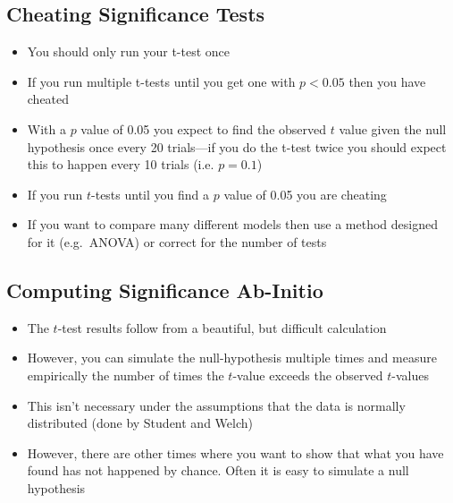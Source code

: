 
\begin{slide}
\section{Cheating Significance Tests}

\begin{PauseHighLight}
  \begin{itemize}
  \item You should only run your t-test once\pause
  \item If you run multiple t-tests until you get one with $p<0.05$
    then you have cheated\pause
  \item With a $p$ value of 0.05 you expect to find the observed $t$
    value given the null hypothesis once every 20 trials\pause---if
    you do the t-test twice you should expect this to happen every 10
    trials (i.e.{} $p=0.1$)\pauseb
  \item If you run $t$-tests until you find a $p$ value of 0.05 you
    are cheating\pause
  \item If you want to compare many different models then use a method
    designed for it (e.g.\ ANOVA) or correct for the number of tests\pause
  \end{itemize}
\end{PauseHighLight}

\end{slide}




\begin{slide}
\section{Computing Significance Ab-Initio}

\begin{PauseHighLight}
  \begin{itemize}
  \item The $t$-test results follow from a beautiful, but
    difficult calculation\pause
  \item However, you can simulate the null-hypothesis multiple times
    and measure empirically the number of times the $t$-value exceeds
    the observed $t$-values\pause
  \item This isn't necessary under the assumptions that the data is
    normally distributed (done by Student and Welch)\pause
  \item However, there are other times where you want to show that
    what you have found has not happened by chance\pause.  Often it is
    easy to simulate a null hypothesis\pause
  \end{itemize}
\end{PauseHighLight}

\end{slide}

